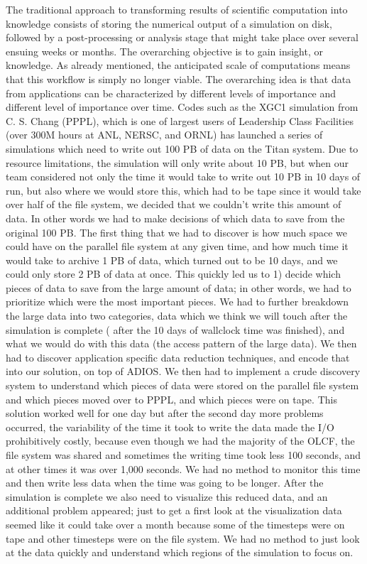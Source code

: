 The traditional approach to transforming results of scientific computation into
knowledge consists of storing the numerical output of a simulation on disk,
followed by a post-processing or analysis stage that might take place over
several ensuing weeks or months. The overarching objective is to gain insight,
or knowledge.  As already mentioned, the anticipated scale of computations
means that this workflow is simply no longer viable.
%
The overarching idea is that data from applications can be characterized by different
levels of importance and different level of importance over time. 
Codes such as the XGC1 simulation from C. S. Chang (PPPL), which is one of largest users of Leadership Class Facilities (over 300M hours at ANL, NERSC, and ORNL) has launched a series of simulations which need to write out 100 PB of data on the Titan system. Due to resource limitations, the simulation will only write about 10 PB, but
when our team considered not only the time it would take to write out 10 PB in 10 days of run, but also where we would store this, which had to be tape since it would take
over half of the file system, we decided that we couldn't write this amount of data. In other words we had to make decisions of which data to save from the original 100 PB.
The first thing that we had to discover is how much space we could have on the parallel file system at any given time, and how much time it would take to archive 1 PB of data,
which turned out to be 10 days, and we could only store 2 PB of data at once. This quickly led us to 1) decide which pieces of data to save from the large amount of data; in 
other words, we had to prioritize which were the most important pieces. We had to further breakdown the large data into two categories, data which we think we will touch after
the simulation is complete ( after the 10 days of wallclock time was finished), and what we would do with this data (the access pattern of the large data). We then had to 
discover application specific data reduction techniques, and encode that into our solution, on top of ADIOS. We then had to implement a crude discovery system to understand
which pieces of data were stored on the parallel file system and which pieces moved over to PPPL, and which pieces were on tape.  This solution worked well for one day
but after the second day more problems occurred, the variability of the time it took to write the data made the I/O prohibitively costly, because even though we had the
majority of the OLCF, the file system was shared and sometimes the writing time took less 100 seconds, and at other times it was over 1,000 seconds. We had no method
to monitor this time and then write less data when the time was going to be longer.   After the simulation is complete we also need to visualize this reduced data, and 
an additional problem appeared; just to get a first look at the visualization data seemed like it could take over a month because some of the timesteps were on tape and other
timesteps were on the file system. We had no method to just look at the data quickly and understand which regions of the simulation to focus on. 






